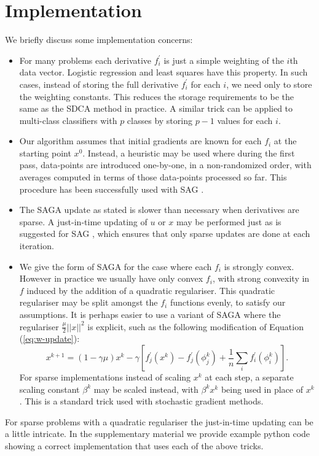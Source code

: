 \documentclass{article}
\newcommand{\stepsize}{\gamma} %
\begin{document}
\section{Implementation}
\label{sec:impl}
\vspace{-2mm}
We briefly discuss some implementation concerns:
\begin{itemize}
\item For many problems each derivative $f^{\prime}_i$ is just a simple weighting of the $i$th data vector. Logistic regression and least squares have this property. In such cases, instead of storing the full derivative $f^{\prime}_i$ for each $i$, we need only to store the weighting constants. This reduces the storage requirements to be the same as the SDCA method in practice. A similar trick can be applied to multi-class classifiers with $p$ classes by storing $p-1$ values for each $i$.
\item Our algorithm assumes that initial gradients are known for each $f_i$ at the starting point $x^{0}$. Instead, a heuristic may be used where during the first pass, data-points are introduced one-by-one, in a non-randomized order, with averages computed in terms of those data-points processed so far. This procedure has been successfully used with SAG \citep{SAG}.
\item The SAGA update as stated is slower than necessary when derivatives are sparse. A just-in-time updating of $u$ or $x$ may be performed just as is suggested for SAG \citep{SAG}, which ensures that only sparse updates are done at each iteration.
\item We give the form of SAGA for the case where each $f_i$ is strongly convex. However in practice we usually have only convex $f_i$, with strong convexity in $f$ induced by the addition of a quadratic regulariser. This quadratic regulariser may be split amongst the $f_i$ functions evenly, to satisfy our assumptions. It is perhaps easier to use a variant of SAGA where the regulariser $\frac{\mu}{2}||x||^2$ is explicit, such as the following modification of Equation (\ref{eq:w-update}):
\[
x^{k+1}=\left(1-\stepsize \mu \right)x^{k}-\stepsize \left[ f_{j}^{\prime}(x^{k})-f_{j}^{\prime}(\phi_{j}^{k})+\frac{1}{n}\sum_{i}f_{i}^{\prime}(\phi_{i}^{k})\right].
 \]
 For sparse implementations instead of scaling $x^k$ at each step, a separate scaling constant $\beta^k$ may be scaled instead, with $\beta^k x^k$ being used in place of $x^k$. This is a standard trick used with stochastic gradient methods.
\end{itemize}
For sparse problems with a quadratic regulariser the just-in-time updating can be a little intricate. In the supplementary material we provide example python code showing a correct implementation that uses each of the above tricks.
\end{document}
